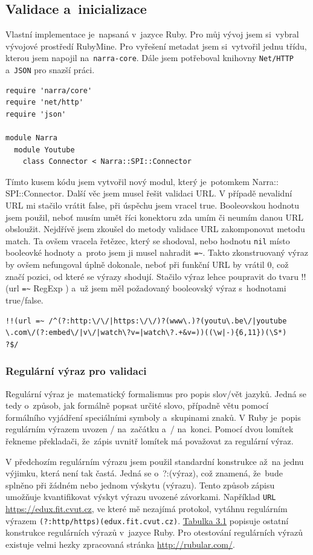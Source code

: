 \subsection{Validace a~inicializace}
\par Vlastní implementace je~napsaná v~jazyce Ruby. Pro můj vývoj jsem si~vybral vývojové prostředí RubyMine. Pro vyřešení metadat jsem si~vytvořil jednu třídu, kterou jsem napojil na~\texttt{narra-core}. Dále jsem potřeboval knihovny \texttt{Net/HTTP} a~\texttt{JSON} pro snazší práci.
\begin{verbatim}
require 'narra/core'
require 'net/http'
require 'json'

module Narra
  module Youtube
    class Connector < Narra::SPI::Connector
\end{verbatim}
\par Tímto kusem kódu jsem vytvořil nový modul, který je~potomkem Narra::\\SPI::Connector. Další věc jsem musel řešit validaci URL. V případě nevalidní URL mi stačilo vrátit false, při úspěchu jsem vracel true. Booleovskou hodnotu jsem použil, neboť musím umět říci konektoru zda umím či neumím danou URL obsloužit. Nejdřívě jsem zkoušel do metody validace URL zakomponovat metodu match. Ta ovšem vracela řetězec, který se shodoval, nebo hodnotu \texttt{nil} místo booleovké hodnoty a~proto jsem ji musel nahradit \verb|=~|. Takto zkonstruovaný výraz by ovšem nefungoval úplně dokonale, neboť při funkční URL by vrátil 0, což značí pozici, od které se výrazy shodují. Stačilo výraz lehce poupravit do tvaru !!(url \verb|=~| RegExp ) a~už jsem měl požadovaný booleovský výraz s~hodnotami true/false.
\begin{verbatim}
!!(url =~ /^(?:http:\/\/|https:\/\/)?(www\.)?(youtu\.be\/|youtube
\.com\/(?:embed\/|v\/|watch\?v=|watch\?.+&v=))((\w|-){6,11})(\S*)
?$/
\end{verbatim}
\subsubsection{Regulární výraz pro validaci}
\par Regulární výraz\cite{regexp} je~matematický formalismus pro popis slov/vět jazyků. Jedná se tedy o~způsob, jak formálně popsat určité slovo, případně větu pomocí formálního vyjádření speciálními symboly a~skupinami znaků. V Ruby\cite{ruby} je~popis regulárním výrazem uvozen / na~začátku a~/ na~konci. Pomocí dvou lomítek řekneme překladači, že~zápis uvnitř lomítek má považovat za regulární výraz.
\par V předchozím regulárním výrazu jsem použil standardní konstrukce až~na jednu výjimku, která není tak častá. Jedná se o~?:(výraz), což znamená, že~bude splněno při žádném nebo jednom výskytu (výrazu). Tento způsob zápisu umožňuje kvantifikovat výskyt výrazu uvozené závorkami. Například \texttt{URL} \url{https://edux.fit.cvut.cz}, ve které mě nezajímá protokol, vytáhnu regulárním výrazem \texttt{(?:http/https)(edux.fit.cvut.cz)}. \hyperlink{regtable}{Tabulka 3.1} popisuje ostatní konstrukce regulárních výrazů v~jazyce Ruby. Pro otestování regulárních výrazů existuje velmi hezky zpracovaná stránka \url{http://rubular.com/}\cite{michaellovitt}.

